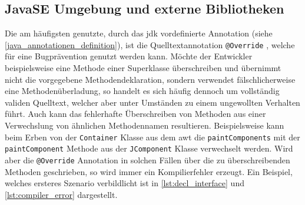 \subsection{JavaSE Umgebung und externe Bibliotheken}
\label{verwendung_im_umfeld_von_java_se}
Die am häufigsten genutzte, durch das \ac{jdk} vordefinierte Annotation (siehe \autoref{java_annotationen_definition}), ist die Quelltextannotation \texttt{@Override} \cite{Rocha2011}, welche für eine Bugprävention genutzt werden kann. Möchte der Entwickler beispielsweise eine Methode einer Superklasse überschreiben und übernimmt nicht die vorgegebene Methodendeklaration, sondern verwendet fälschlicherweise eine Methodenüberladung, so handelt es sich häufig dennoch um vollständig validen Quelltext, welcher aber unter Umständen zu einem ungewollten Verhalten führt. Auch kann das fehlerhafte Überschreiben von Methoden aus einer Verwechslung von ähnlichen Methodennamen resultieren. Beispielsweise kann beim Erben von der \texttt{Container} Klasse aus dem \ac{awt} die \texttt{paintComponents} mit der \texttt{paintComponent} Methode aus der \texttt{JComponent} Klasse verwechselt werden. Wird aber die \texttt{@Override} Annotation in solchen Fällen über die zu überschreibenden Methoden geschrieben, so wird immer ein Kompilierfehler erzeugt. Ein Beispiel, welches ersteres Szenario verbildlicht ist in \autoref{lst:decl_interface} und \autoref{lst:compiler_error} dargestellt.

